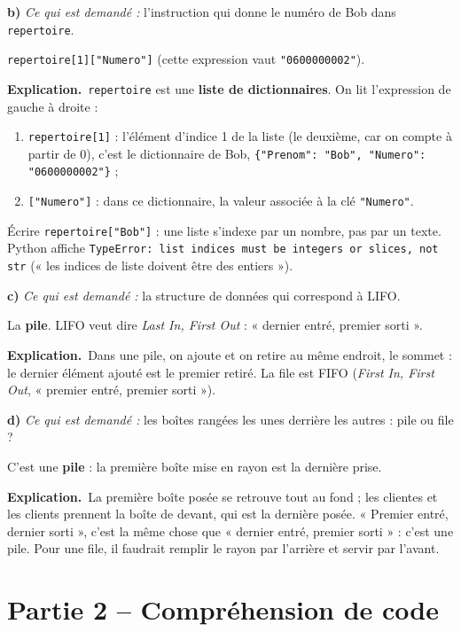 \documentclass[11pt, a4paper]{exam}
\newcommand{\code}[1]{\texttt{#1}}
\newcommand{\rappel}[1]{\noindent\textit{Ce qui est demandé :} #1\par\smallskip}
\newcommand{\explication}{\noindent\textbf{Explication.}\ }
\begin{document}
\textbf{b)} \rappel{l'instruction qui donne le numéro de Bob dans \code{repertoire}.}
\begin{reponse}
\code{repertoire[1]["Numero"]} (cette expression vaut \code{"0600000002"}).
\end{reponse}
\explication \code{repertoire} est une \textbf{liste de dictionnaires}. On lit l'expression de gauche à droite :
\begin{enumerate}
\item \code{repertoire[1]} : l'élément d'indice 1 de la liste (le deuxième, car on compte à partir de 0), c'est le dictionnaire de Bob, \code{\{"Prenom": "Bob", "Numero": "0600000002"\}} ;
\item \code{["Numero"]} : dans ce dictionnaire, la valeur associée à la clé \code{"Numero"}.
\end{enumerate}

\begin{erreur}
Écrire \code{repertoire["Bob"]} : une liste s'indexe par un nombre, pas par un texte. Python affiche \code{TypeError: list indices must be integers or slices, not str} (« les indices de liste doivent être des entiers »).
\end{erreur}

\textbf{c)} \rappel{la structure de données qui correspond à LIFO.}
\begin{reponse}
La \textbf{pile}. LIFO veut dire \textit{Last In, First Out} : « dernier entré, premier sorti ».
\end{reponse}
\explication Dans une pile, on ajoute et on retire au même endroit, le sommet : le dernier élément ajouté est le premier retiré. La file est FIFO (\textit{First In, First Out}, « premier entré, premier sorti »).

\textbf{d)} \rappel{les boîtes rangées les unes derrière les autres : pile ou file ?}
\begin{reponse}
C'est une \textbf{pile} : la première boîte mise en rayon est la dernière prise.
\end{reponse}
\explication La première boîte posée se retrouve tout au fond ; les clientes et les clients prennent la boîte de devant, qui est la dernière posée. « Premier entré, dernier sorti », c'est la même chose que « dernier entré, premier sorti » : c'est une pile. Pour une file, il faudrait remplir le rayon par l'arrière et servir par l'avant.

\section*{Partie 2 -- Compréhension de code}
\end{document}
